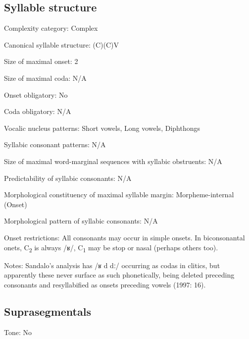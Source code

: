 {\subsection*{Syllable structure}
\begin{appendixdesc}

\item[Complexity category:] Complex

\item[Canonical syllable structure:] (C)(C)V \citep[17--18]{Sandalo1997}

\item[Size of maximal onset:] 2

\item[Size of maximal coda:] N/A

\item[Onset obligatory:] No

\item[Coda obligatory:] N/A

\item[Vocalic nucleus patterns:] Short vowels, Long vowels, Diphthongs

\item[Syllabic consonant patterns:] N/A

\item[Size of maximal word-marginal sequences with syllabic obstruents:] N/A

\item[Predictability of syllabic consonants:] N/A

\item[Morphological constituency of maximal syllable margin:] Morpheme-internal (Onset)

\item[Morphological pattern of syllabic consonants:] N/A

\item[Onset restrictions:] All consonants may occur in simple onsets. In biconsonantal onets, C\textsubscript{2} is always /ʁ/, C\textsubscript{1} may be stop or nasal (perhaps others too).

\item[Notes:] Sandalo’s analysis has /ʁ d dː/ occurring as codas in clitics, but apparently these never surface as such phonetically, being deleted preceding consonants and resyllabified as onsets preceding vowels (1997: 16).
\end{appendixdesc}
\subsection*{Suprasegmentals}
\begin{appendixdesc}
\item[Tone:] No


\end{appendixdesc}}
